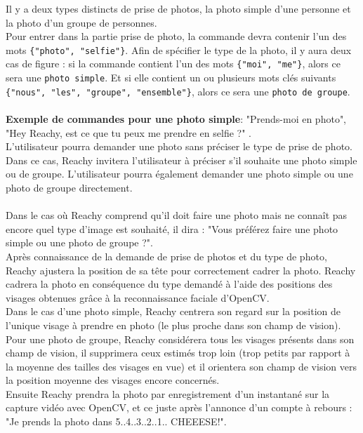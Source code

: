 Il y a deux types distincts de prise de photos, la photo simple d'une personne et la photo d'un groupe de personnes. \\

Pour entrer dans la partie prise de photo, la commande devra contenir l'un des mots \texttt{\{"photo", "selfie"\}}. Afin de spécifier le type de la photo, il y aura deux cas de figure : si la commande contient l'un des mots \texttt{\{"moi", "me"\}}, alors ce sera une \texttt{photo simple}. Et si elle contient un ou plusieurs mots clés suivants \texttt{\{"nous", "les", "groupe", "ensemble"\}}, alors ce sera une \texttt{photo de groupe}. \\ \\
\textbf{Exemple de commandes pour une photo simple}: "Prends-moi en photo", "Hey Reachy, est ce que tu peux me prendre en selfie ?" . \\

L'utilisateur pourra demander une photo sans préciser le type de prise de photo. Dans ce cas, Reachy invitera l'utilisateur à préciser s'il souhaite une photo simple ou de groupe. L'utilisateur pourra également demander une photo simple ou une photo de groupe directement. \\ \\
Dans le cas où Reachy comprend qu'il doit faire une photo mais ne connaît pas encore quel type d'image est souhaité, il dira : "Vous préférez faire une photo simple ou une photo de groupe ?". \\

Après connaissance de la demande de prise de photos et du type de photo, Reachy ajustera la position de sa tête pour correctement cadrer la photo. Reachy cadrera la photo en conséquence du type demandé à l'aide des positions des visages obtenues grâce à la reconnaissance faciale d'OpenCV.\\

Dans le cas d'une photo simple, Reachy centrera son regard sur la position de l'unique visage à prendre en photo (le plus proche dans son champ de vision). Pour une photo de groupe, Reachy considérera tous les visages présents dans son champ de vision, il supprimera ceux estimés trop loin (trop petits par rapport à la moyenne des tailles des visages en vue) et il orientera son champ de vision vers la position moyenne des visages encore concernés.\\

Ensuite Reachy prendra la photo par enregistrement d'un instantané sur la capture vidéo avec OpenCV, et ce juste après l'annonce d'un compte à rebours : "Je prends la photo dans 5..4..3..2..1.. CHEEESE!". \\

